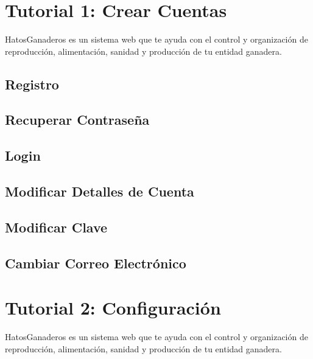 \documentclass[letterpaper,10pt,spanish]{sphinxmanual}
\begin{document}
\section{Tutorial 1: Crear Cuentas}
\label{Tutorial 1: Crear Cuentas::doc}\label{Tutorial 1: Crear Cuentas:tutorial-1-crear-cuentas}
HatosGanaderos es un sistema web que te ayuda con el control y organización de reproducción, alimentación, sanidad y producción de tu entidad ganadera.


\subsection{Registro}
\label{Tutorial 1: Crear Cuentas:registro}

\subsection{Recuperar Contraseña}
\label{Tutorial 1: Crear Cuentas:recuperar-contrasena}

\subsection{Login}
\label{Tutorial 1: Crear Cuentas:login}

\subsection{Modificar Detalles de Cuenta}
\label{Tutorial 1: Crear Cuentas:modificar-detalles-de-cuenta}

\subsection{Modificar Clave}
\label{Tutorial 1: Crear Cuentas:modificar-clave}

\subsection{Cambiar Correo Electrónico}
\label{Tutorial 1: Crear Cuentas:cambiar-correo-electronico}

\section{Tutorial 2: Configuración}
\label{Tutorial 2: Configuraci_xf3n:tutorial-2-configuracion}\label{Tutorial 2: Configuraci_xf3n::doc}
HatosGanaderos es un sistema web que te ayuda con el control y organización de reproducción, alimentación, sanidad y producción de tu entidad ganadera.
\end{document}
